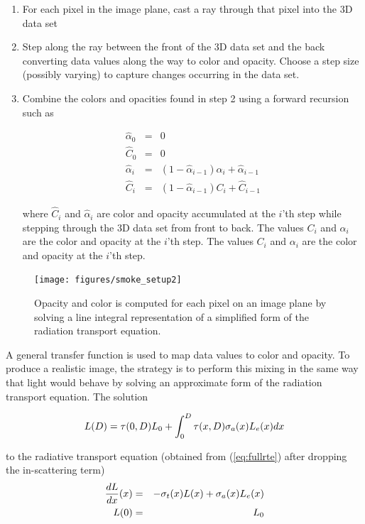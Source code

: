 \begin{enumerate}
\item For each pixel in the image plane, cast a ray through that pixel into the 3D data set
\item Step along the ray between the front of the 3D data set and the back
converting data values along the way to color and opacity.  Choose a step size (possibly varying) to capture changes occurring in the data set.
\item
Combine the colors and opacities found in step 2 using a forward recursion such as \cite[Chapter 39]{gpugems} 

\begin{eqnarray*}
\hat{\alpha}_0&=&0\\
\hat{C}_0&=&0\\
\hat{\alpha}_i&=&\left(1-\hat{\alpha}_{i-1}\right)\alpha_i+\hat{\alpha}_{i-1}\\
\hat{C}_i&=&\left(1-\hat{\alpha}_{i-1}\right)C_i + \hat{C}_{i-1}
\end{eqnarray*}

where $\hat{C}_i$ and $\hat{\alpha}_i$ are color and opacity accumulated at the $i$'th step while stepping through the 3D data set from front to back.  The values $C_i$ and $\alpha_i$
are the color and opacity at the $i$'th step.  
The values $C_i$ and $\alpha_i$
are the color and opacity at the $i$'th step.  
\end{enumerate}

\begin{figure}[\figoptions]
\begin{center}
\texttt{[image: figures/smoke\_setup2]}
\end{center}
\caption {Opacity and color is computed for each pixel on an image plane by solving a line integral
representation of a simplified form of the radiation transport equation.
}
\label{figsmokesetup2}
\end{figure}

A general transfer function is used to map data values to color and opacity. To produce a realistic image, the strategy is to perform this mixing in the same way that light would behave by solving an approximate form of the radiation transport equation.  The solution

\begin{equation}
\label{eq:rtesoln}
 L(D)=\tau(0,D)L_0 + \int_0^D\tau(x,D)\sigma_a(x)L_e(x) dx
\end{equation}

to the radiative transport equation (obtained from (\ref{eq:fullrte}) after dropping the in-scattering term)
\begin{eqnarray*}
\frac{dL}{dx}(x)&=&-\sigma_t(x) L(x) + \sigma_a(x) L_e(x)\\
 L(0)&=&L_0\nonumber
\end{eqnarray*}


